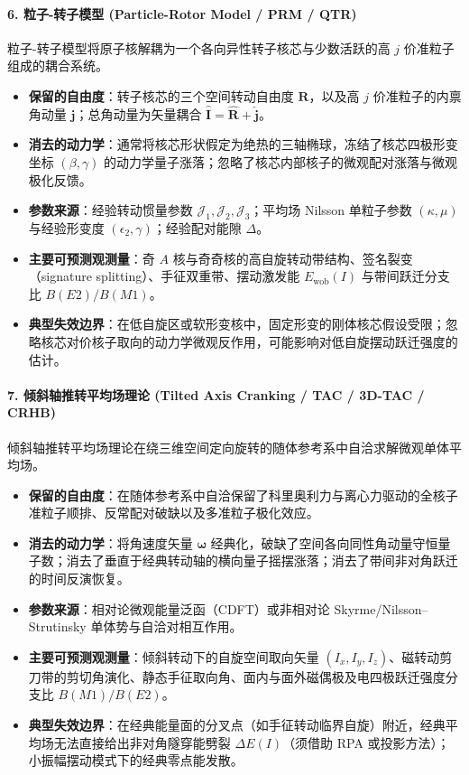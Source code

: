 \paragraph{6. 粒子-转子模型 (Particle-Rotor Model / PRM / QTR)}
粒子-转子模型将原子核解耦为一个各向异性转子核芯与少数活跃的高 $j$ 价准粒子组成的耦合系统。\cite{book-bohr-mottelson-nuclear-structure-vol2,meyertervehn_1975_collective-description-transitional,frauendorf_2014_Transversewobbling}
\begin{itemize}
\item \textbf{保留的自由度}：转子核芯的三个空间转动自由度 $\mathbf{R}$，以及高 $j$ 价准粒子的内禀角动量 $\mathbf{j}$；总角动量为矢量耦合 $\hat{\mathbf{I}} = \hat{\mathbf{R}} + \hat{\mathbf{j}}$。
\item \textbf{消去的动力学}：通常将核芯形状假定为绝热的三轴椭球，冻结了核芯四极形变坐标 $(\beta, \gamma)$ 的动力学量子涨落；忽略了核芯内部核子的微观配对涨落与微观极化反馈。
\item \textbf{参数来源}：经验转动惯量参数 $\mathcal{J}_1, \mathcal{J}_2, \mathcal{J}_3$；平均场 Nilsson 单粒子参数 $(\kappa, \mu)$ 与经验形变度 $(\epsilon_2, \gamma)$；经验配对能隙 $\Delta$。
\item \textbf{主要可预测观测量}：奇 $A$ 核与奇奇核的高自旋转动带结构、签名裂变（signature splitting）、手征双重带、摆动激发能 $E_{\mathrm{wob}}(I)$ 与带间跃迁分支比 $B(E2)/B(M1)$。
\item \textbf{典型失效边界}：在低自旋区或软形变核中，固定形变的刚体核芯假设受限；忽略核芯对价核子取向的动力学微观反作用，可能影响对低自旋摆动跃迁强度的估计。\cite{nomura_2022_Questioningwobbling}
\end{itemize}

\paragraph{7. 倾斜轴推转平均场理论 (Tilted Axis Cranking / TAC / 3D-TAC / CRHB)}
倾斜轴推转平均场理论在绕三维空间定向旋转的随体参考系中自洽求解微观单体平均场。\cite{frauendorf-2001-spontaneous-symmetry-breaking-rotating-nuclei,frauendorf-meng-1997-tilted-rotation-chirality}
\begin{itemize}
\item \textbf{保留的自由度}：在随体参考系中自洽保留了科里奥利力与离心力驱动的全核子准粒子顺排、反常配对破缺以及多准粒子极化效应。
\item \textbf{消去的动力学}：将角速度矢量 $\boldsymbol{\omega}$ 经典化，破缺了空间各向同性角动量守恒量子数；消去了垂直于经典转动轴的横向量子摇摆涨落；消去了带间非对角跃迁的时间反演恢复。
\item \textbf{参数来源}：相对论微观能量泛函（CDFT）或非相对论 Skyrme/Nilsson--Strutinsky 单体势与自洽对相互作用。
\item \textbf{主要可预测观测量}：倾斜转动下的自旋空间取向矢量 $(I_x, I_y, I_z)$、磁转动剪刀带的剪切角演化、静态手征取向角、面内与面外磁偶极及电四极跃迁强度分支比 $B(M1)/B(E2)$。
\item \textbf{典型失效边界}：在经典能量面的分叉点（如手征转动临界自旋）附近，经典平均场无法直接给出非对角隧穿能劈裂 $\Delta E(I)$（须借助 RPA 或投影方法）；小振幅摆动模式下的经典零点能发散。
\end{itemize}


